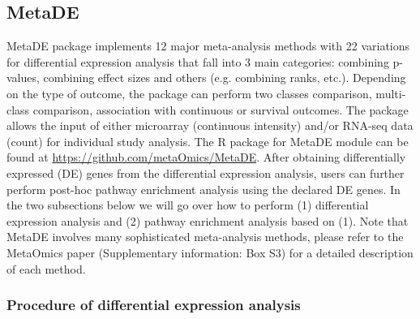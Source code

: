 \subsection{MetaDE}

MetaDE package implements 12 major meta-analysis methods with 22 variations for differential expression analysis that fall into 3 main categories: combining p-values, combining effect sizes and others (e.g. combining ranks, etc.). Depending on the type of outcome, the package can perform two classes comparison, multi-class comparison, association with continuous or survival outcomes. The package allows the input of either microarray (continuous intensity) and/or RNA-seq data (count) for individual study analysis. 
The R package for MetaDE module can be found at \url{https://github.com/metaOmics/MetaDE}.
After obtaining differentially expressed (DE) genes from the differential expression analysis, 
users can further perform post-hoc pathway enrichment analysis using the declared DE genes.
In the two subsections below we will go over how to perform (1) differential expression analysis and (2) pathway enrichment analysis based on (1).
Note that 
MetaDE involves many sophisticated meta-analysis methods, please refer to the MetaOmics paper (Supplementary information: Box S3) for a detailed description of each method. 

\subsubsection{Procedure of differential expression analysis}

